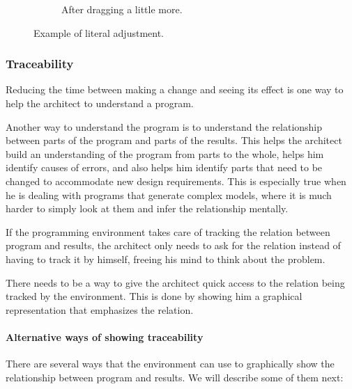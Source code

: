 \begin{figure}
\begin{subfigure}[b]{0.3\linewidth}
    \caption{After dragging a little more.}
  \end{subfigure}
  \caption{Example of literal adjustment.}
  \label{fig:lit:adjust}
\end{figure}


\subsubsection{Traceability}
\label{sec:traceability}
Reducing the time between making a change and seeing its effect is one way to help the architect to understand a program.

Another way to understand the program is to understand the relationship between parts of the program and parts of the results.
This helps the architect build an understanding of the program from parts to the whole, helps him identify causes of errors, and also helps him identify parts that need to be changed to accommodate new design requirements.
This is especially true when he is dealing with programs that generate complex models, where it is much harder to simply look at them and infer the relationship mentally.

If the programming environment takes care of tracking the relation between program and results, the architect only needs to ask for the relation instead of having to track it by himself, freeing his mind to think about the problem.

There needs to be a way to give the architect quick access to the relation being tracked by the environment.
This is done by showing him a graphical representation that emphasizes the relation.

\paragraph{Alternative ways of showing traceability}
There are several ways that the environment can use to graphically show the relationship between program and results.
We will describe some of them next:

